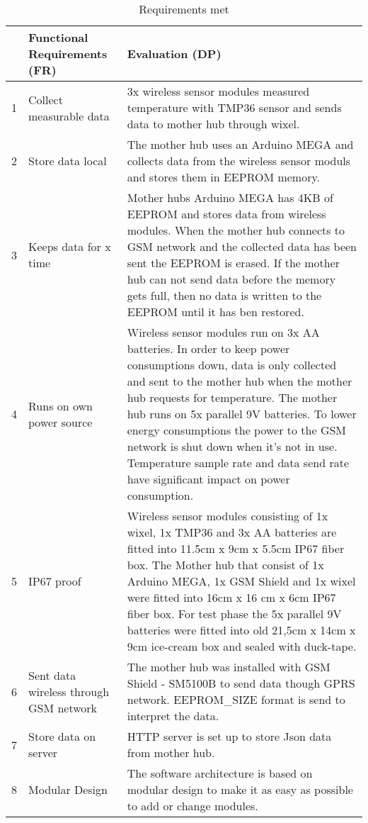  \begin{table}[H]
 	\caption{Requirements met}
 	\label{tbl:FR-Eva}
 	\begin{tabular}{|l|p{4cm}| p{} |}
 		
 		\hline
 		& \textbf{Functional Requirements (FR)}  & \textbf{Evaluation (DP)} \\  
 		\hline 1 &  Collect measurable data & 3x wireless sensor modules measured temperature with  TMP36 \cite{Devices2010} sensor and sends data to mother hub through wixel. \\ 
 		           		
 		\hline 2 & Store data local &   The mother hub uses an Arduino MEGA and collects data from the wireless sensor moduls and stores them in EEPROM memory. \\
 	
 		\hline 3 & Keeps data for x time &  Mother hubs Arduino MEGA \cite{arduinoMega} has 4KB of EEPROM and stores  data from wireless modules. When the mother hub connects to GSM network and the collected data has been sent the EEPROM is erased. If the mother hub can not send data before the memory gets full, then no data is written to the EEPROM until it has ben restored.  \\
 	
 		\hline 4 & Runs on own power source & Wireless sensor modules run on 3x AA batteries. In order to keep power consumptions down, data is only collected and sent to the mother hub when the mother hub requests for temperature. The mother hub runs on 5x parallel 9V batteries.  To lower energy consumptions the power to the GSM network is shut down when it's not in use. Temperature sample rate and data send rate have significant impact on power consumption. \\ 
 	
 		\hline 5 & IP67 proof &   Wireless sensor modules consisting of 1x wixel, 1x TMP36 and 3x AA batteries are fitted into 11.5cm x 9cm x 5.5cm IP67 fiber box. The Mother hub that consist of 1x Arduino MEGA, 1x GSM Shield and 1x wixel were fitted into 16cm x 16 cm x 6cm IP67 fiber box. For test phase the 5x parallel 9V batteries were fitted into old 21,5cm x 14cm x 9cm ice-cream box and sealed with duck-tape. \\
 	
 		\hline 6 & Sent data wireless through GSM network & The mother hub was installed with GSM Shield - SM5100B \cite{SMP5100B} to send data though GPRS network. EEPROM_SIZE format is send to interpret the data. \\ 
 	
 		\hline 7 & Store data on server & HTTP server is set up to store Json data from mother hub. \\ 
 	
 		\hline 8 & Modular Design & The software architecture is based on modular design to make it as easy as possible to add or change modules.  \\
 		\hline
 	\end{tabular}
 \end{table}

